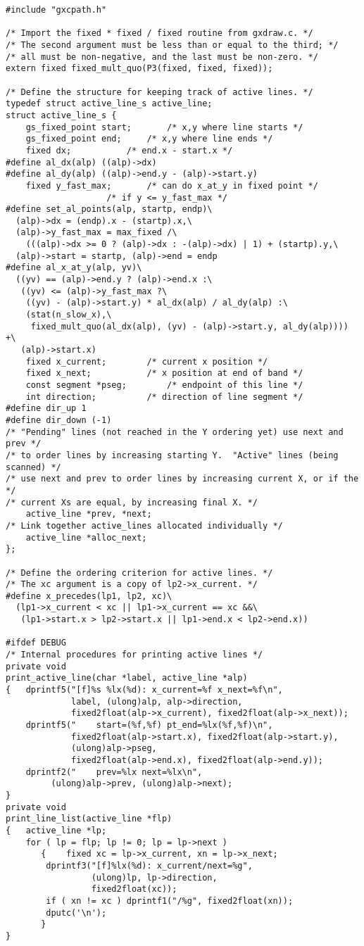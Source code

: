 
\begin{verbatim}
#include "gxcpath.h"

/* Import the fixed * fixed / fixed routine from gxdraw.c. */
/* The second argument must be less than or equal to the third; */
/* all must be non-negative, and the last must be non-zero. */
extern fixed fixed_mult_quo(P3(fixed, fixed, fixed));

/* Define the structure for keeping track of active lines. */
typedef struct active_line_s active_line;
struct active_line_s {
	gs_fixed_point start;		/* x,y where line starts */
	gs_fixed_point end;		/* x,y where line ends */
	fixed dx;			/* end.x - start.x */
#define al_dx(alp) ((alp)->dx)
#define al_dy(alp) ((alp)->end.y - (alp)->start.y)
	fixed y_fast_max;		/* can do x_at_y in fixed point */
					/* if y <= y_fast_max */
#define set_al_points(alp, startp, endp)\
  (alp)->dx = (endp).x - (startp).x,\
  (alp)->y_fast_max = max_fixed /\
    (((alp)->dx >= 0 ? (alp)->dx : -(alp)->dx) | 1) + (startp).y,\
  (alp)->start = startp, (alp)->end = endp
#define al_x_at_y(alp, yv)\
  ((yv) == (alp)->end.y ? (alp)->end.x :\
   ((yv) <= (alp)->y_fast_max ?\
    ((yv) - (alp)->start.y) * al_dx(alp) / al_dy(alp) :\
    (stat(n_slow_x),\
     fixed_mult_quo(al_dx(alp), (yv) - (alp)->start.y, al_dy(alp)))) +\
   (alp)->start.x)
	fixed x_current;		/* current x position */
	fixed x_next;			/* x position at end of band */
	const segment *pseg;		/* endpoint of this line */
	int direction;			/* direction of line segment */
#define dir_up 1
#define dir_down (-1)
/* "Pending" lines (not reached in the Y ordering yet) use next and prev */
/* to order lines by increasing starting Y.  "Active" lines (being scanned) */
/* use next and prev to order lines by increasing current X, or if the */
/* current Xs are equal, by increasing final X. */
	active_line *prev, *next;
/* Link together active_lines allocated individually */
	active_line *alloc_next;
};

/* Define the ordering criterion for active lines. */
/* The xc argument is a copy of lp2->x_current. */
#define x_precedes(lp1, lp2, xc)\
  (lp1->x_current < xc || lp1->x_current == xc &&\
   (lp1->start.x > lp2->start.x || lp1->end.x < lp2->end.x))

#ifdef DEBUG
/* Internal procedures for printing active lines */
private void
print_active_line(char *label, active_line *alp)
{	dprintf5("[f]%s %lx(%d): x_current=%f x_next=%f\n",
	         label, (ulong)alp, alp->direction,
	         fixed2float(alp->x_current), fixed2float(alp->x_next));
	dprintf5("    start=(%f,%f) pt_end=%lx(%f,%f)\n",
	         fixed2float(alp->start.x), fixed2float(alp->start.y),
	         (ulong)alp->pseg,
	         fixed2float(alp->end.x), fixed2float(alp->end.y));
	dprintf2("    prev=%lx next=%lx\n",
		 (ulong)alp->prev, (ulong)alp->next);
}
private void
print_line_list(active_line *flp)
{	active_line *lp;
	for ( lp = flp; lp != 0; lp = lp->next )
	   {	fixed xc = lp->x_current, xn = lp->x_next;
		dprintf3("[f]%lx(%d): x_current/next=%g",
		         (ulong)lp, lp->direction,
		         fixed2float(xc));
		if ( xn != xc ) dprintf1("/%g", fixed2float(xn));
		dputc('\n');
	   }
}
\end{verbatim}
